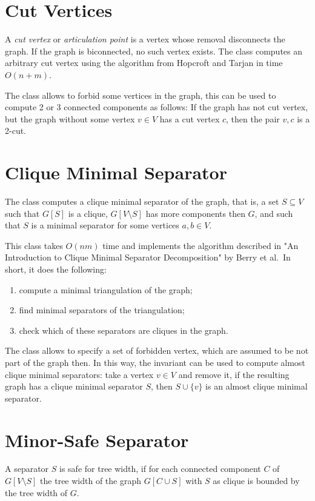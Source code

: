 \documentclass[a4paper, ukenglish, twoside, openright]{jdrasilmanual}
\begin{document}
\section{Cut Vertices}
A \emph{cut vertex} or \emph{articulation point} is a vertex whose removal
disconnects the graph. If the graph is biconnected, no such vertex
exists. The class  computes an arbitrary cut vertex using the
algorithm from Hopcroft and Tarjan in time $O(n+m)$.
 
The class allows to forbid some vertices in the graph, this can be used
to compute 2 or 3 connected components as follows: If the graph has not
cut vertex, but the graph without some vertex \(v\in V\) has a cut
vertex \(c\), then the pair \(v,c\) is a 2-cut.

\section{Clique Minimal Separator}
The class  computes a clique minimal separator of the graph, that is, a set
\(S\subseteq V\) such that \(G[S]\) is a clique, \(G[V\setminus S]\)
has more components then $G$, and such that \(S\) is a minimal separator
for some vertices \(a,b\in V\).
 
This class takes \(O(nm)\) time and implements the algorithm described
in "An Introduction to Clique Minimal Separator Decomposition" by
Berry et al.\, In short, it does the following:
\begin{enumerate}
  \item compute a minimal triangulation of the graph;
  \item find minimal separators of the triangulation;
  \item check which of these separators are cliques in the graph.
 \end{enumerate}
 The class allows to specify a set of forbidden vertex, which are
 assumed to be not part of the graph then. In this way, the invariant
 can be used to compute almost clique minimal separators: take a
 vertex \(v\in V\) and remove it, if the resulting graph has a clique
 minimal separator \(S\), then \(S\cup\{v\}\) is an almost clique
 minimal separator.

\section{Minor-Safe Separator}
A separator \(S\) is safe for tree width, if for each connected
component \(C\) of \(G[V\setminus S]\) the tree width of the
graph \(G[C\cup S]\) with \(S\) as clique is bounded by the tree width
of \(G\).
 
\end{document}
